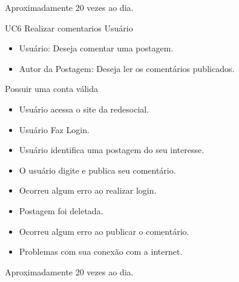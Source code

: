 {Aproximadamente 20 vezes ao dia.}
{

}

\casoDeUso
{UC6}
{Realizar comentarios}
{Usuário}
{
\begin{itemize}
	\item Usuário: Deseja comentar uma postagem.
	\item Autor da Postagem: Deseja ler os comentários publicados.
\end{itemize}

}
{Possuir uma conta válida}
{}
{
\begin{itemize}
\item Usuário acessa o site da redesocial.
\item Usuário Faz Login.
\item Usuário identifica uma postagem do seu interesse.
\item O usuário digite e publica seu comentário.
\end{itemize}
}
{
\begin{itemize}
\item Ocorreu algum erro ao realizar login.
\item Postagem foi deletada.
\item Ocorreu algum erro ao publicar o comentário.
\item Problemas com sua conexão com a internet.
\end{itemize}
}
{Aproximadamente 20 vezes ao dia.}
{

}


